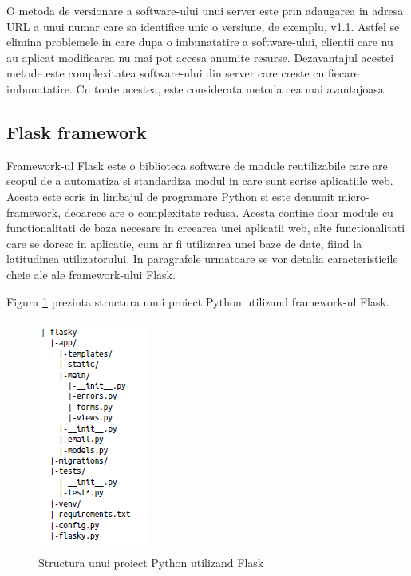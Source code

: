 O metoda de versionare a software-ului unui server este prin adaugarea in adresa URL a unui numar care sa identifice unic o versiune, de exemplu, v1.1. 
Astfel se elimina problemele in care dupa o imbunatatire a software-ului, clientii care nu au aplicat modificarea nu mai pot accesa anumite resurse. 
Dezavantajul acestei metode este complexitatea software-ului din server care creste cu fiecare imbunatatire. Cu toate acestea, este considerata metoda 
cea mai avantajoasa.

\subsection{Flask framework}\label{sec:flask}
Framework-ul Flask este o biblioteca software de module reutilizabile care are scopul de a automatiza si standardiza modul in care sunt scrise aplicatiile 
web. Acesta este scris in limbajul de programare Python si este denumit micro-framework, deoarece are o complexitate redusa. Acesta contine doar module 
cu functionalitati de baza necesare in creearea unei aplicatii web, alte functionalitati care se doresc in aplicatie, cum ar fi utilizarea unei baze de 
date, fiind la latitudinea utilizatorului. In paragrafele urmatoare se vor detalia caracteristicile cheie ale ale framework-ului Flask.

Figura \ref{fig:FlaskProjectStructure} prezinta structura unui proiect Python utilizand framework-ul Flask.
\begin{figure}[H]
    \centering
    \includegraphics[scale=0.75]{figs/FlaskProjectStructure.png}
    \caption{Structura unui proiect Python utilizand Flask \cite{flaskweb}}
    \label{fig:FlaskProjectStructure}
\end{figure}

